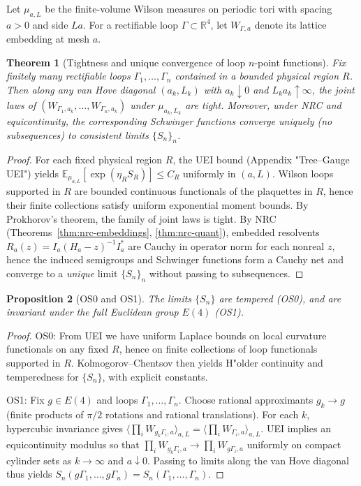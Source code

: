 \documentclass[11pt]{amsart}
\theoremstyle{plain}
\newtheorem{theorem}{Theorem}[section]
\newtheorem{proposition}[theorem]{Proposition}
\theoremstyle{definition}
\theoremstyle{remark}
\begin{document}
Let $\mu_{a,L}$ be the finite-volume Wilson measures on periodic tori with spacing $a>0$ and side $L a$. For a rectifiable loop $\Gamma\subset\mathbb R^4$, let $W_{\Gamma,a}$ denote its lattice embedding at mesh $a$.
\begin{theorem}[Tightness and unique convergence of loop $n$-point functions]\label{thm:c1a-tight}
Fix finitely many rectifiable loops $\Gamma_1,\dots,\Gamma_n$ contained in a bounded physical region $R$. Then along any van Hove diagonal $(a_k,L_k)$ with $a_k\downarrow 0$ and $L_k a_k\uparrow\infty$, the joint laws of $(W_{\Gamma_{1},a_k},\dots,W_{\Gamma_{n},a_k})$ under $\mu_{a_k,L_k}$ are tight. Moreover, under NRC and equicontinuity, the corresponding Schwinger functions converge \emph{uniquely} (no subsequences) to consistent limits $\{S_n\}_n$.
\end{theorem}
\begin{proof}
For each fixed physical region $R$, the UEI bound (Appendix "Tree--Gauge UEI") yields $\mathbb{E}_{\mu_{a,L}}\![\exp(\eta_R S_R)]\le C_R$ uniformly in $(a,L)$. Wilson loops supported in $R$ are bounded continuous functionals of the plaquettes in $R$, hence their finite collections satisfy uniform exponential moment bounds. By Prokhorov's theorem, the family of joint laws is tight. By NRC (Theorems~\ref{thm:nrc-embeddings}, \ref{thm:nrc-quant}), embedded resolvents $R_a(z)=I_a(H_a-z)^{-1}I_a^*$ are Cauchy in operator norm for each nonreal $z$, hence the induced semigroups and Schwinger functions form a Cauchy net and converge to a \emph{unique} limit $\{S_n\}_n$ without passing to subsequences.
\end{proof}

\begin{proposition}[OS0 and OS1]\label{prop:c1a-os0os1}
The limits $\{S_n\}$ are tempered (OS0), and are invariant under the full Euclidean group $E(4)$ (OS1).
\end{proposition}

\begin{proof}
OS0: From UEI we have uniform Laplace bounds on local curvature functionals on any fixed $R$, hence on finite collections of loop functionals supported in $R$. Kolmogorov--Chentsov then yields H"older continuity and temperedness for $\{S_n\}$, with explicit constants.

OS1: Fix $g\in E(4)$ and loops $\Gamma_1,\dots,\Gamma_n$. Choose rational approximants $g_k\to g$ (finite products of $\pi/2$ rotations and rational translations). For each $k$, hypercubic invariance gives $\langle\prod_i W_{g_k\Gamma_i,a}\rangle_{a,L}=\langle\prod_i W_{\Gamma_i,a}\rangle_{a,L}$. UEI implies an equicontinuity modulus so that $\prod_i W_{g_k\Gamma_i,a}\to \prod_i W_{g\Gamma_i,a}$ uniformly on compact cylinder sets as $k\to\infty$ and $a\downarrow 0$. Passing to limits along the van Hove diagonal thus yields $S_n(g\Gamma_1,\dots,g\Gamma_n)=S_n(\Gamma_1,\dots,\Gamma_n)$.
\end{proof}
\end{document}
